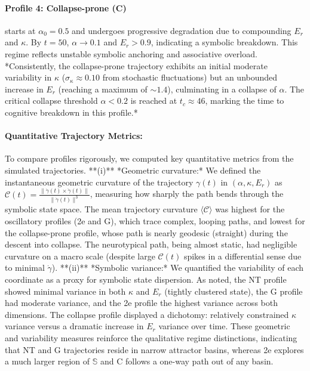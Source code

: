 \paragraph{Profile 4: Collapse-prone (C)} starts at $\alpha_0 = 0.5$ and undergoes progressive degradation due to compounding $E_r$ and $\kappa$. By $t = 50$, $\alpha \rightarrow 0.1$ and $E_r > 0.9$, indicating a symbolic breakdown. This regime reflects unstable symbolic anchoring and associative overload. *Consistently, the collapse-prone trajectory exhibits an initial moderate variability in $\kappa$ ($\sigma_{\kappa}\approx0.10$ from stochastic fluctuations) but an unbounded increase in $E_r$ (reaching a maximum of $\sim1.4$), culminating in a collapse of $\alpha$. The critical collapse threshold $\alpha<0.2$ is reached at $t_c \approx 46$, marking the time to cognitive breakdown in this profile.* 

\paragraph{Quantitative Trajectory Metrics:} To compare profiles rigorously, we computed key quantitative metrics from the simulated trajectories. **(i)** *Geometric curvature:* We defined the instantaneous geometric curvature of the trajectory $\gamma(t)$ in $(\alpha,\kappa,E_r)$ as $\mathcal{C}(t) = \frac{\|\dot{\gamma}(t)\times \ddot{\gamma}(t)\|}{\|\dot{\gamma}(t)\|^3}$, measuring how sharply the path bends through the symbolic state space. The mean trajectory curvature $\langle \mathcal{C}\rangle$ was highest for the oscillatory profiles (2e and G), which trace complex, looping paths, and lowest for the collapse-prone profile, whose path is nearly geodesic (straight) during the descent into collapse. The neurotypical path, being almost static, had negligible curvature on a macro scale (despite large $\mathcal{C}(t)$ spikes in a differential sense due to minimal $\dot{\gamma}$). **(ii)** *Symbolic variance:* We quantified the variability of each coordinate as a proxy for symbolic state dispersion. As noted, the NT profile showed minimal variance in both $\kappa$ and $E_r$ (tightly clustered state), the G profile had moderate variance, and the 2e profile the highest variance across both dimensions. The collapse profile displayed a dichotomy: relatively constrained $\kappa$ variance versus a dramatic increase in $E_r$ variance over time. These geometric and variability measures reinforce the qualitative regime distinctions, indicating that NT and G trajectories reside in narrow attractor basins, whereas 2e explores a much larger region of $\mathbb{S}$ and C follows a one-way path out of any basin.

